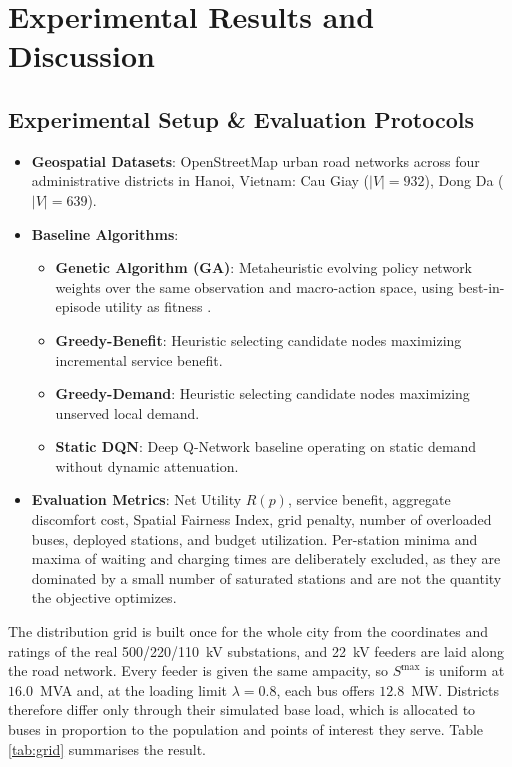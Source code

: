 \documentclass[10pt, conference, a4paper, compsocconf]{IEEEtran}
\begin{document}
\section{Experimental Results and Discussion}
\label{sec:results}

\subsection{Experimental Setup \& Evaluation Protocols}
\begin{itemize}
    \item \textbf{Geospatial Datasets}: OpenStreetMap urban road networks across four administrative districts in Hanoi, Vietnam: Cau Giay ($|V|=932$), Dong Da ($|V|=639$).
    \item \textbf{Baseline Algorithms}:
    \begin{itemize}
        \item \textbf{Genetic Algorithm (GA)}: Metaheuristic evolving policy network weights over the same observation and macro-action space, using best-in-episode utility as fitness \cite{chen2023}.
        \item \textbf{Greedy-Benefit}: Heuristic selecting candidate nodes maximizing incremental service benefit.
        \item \textbf{Greedy-Demand}: Heuristic selecting candidate nodes maximizing unserved local demand.
        \item \textbf{Static DQN}: Deep Q-Network baseline operating on static demand without dynamic attenuation.
    \end{itemize}
    \item \textbf{Evaluation Metrics}: Net Utility $R(p)$, service benefit, aggregate discomfort cost, Spatial Fairness Index, grid penalty, number of overloaded buses, deployed stations, and budget utilization. Per-station minima and maxima of waiting and charging times are deliberately excluded, as they are dominated by a small number of saturated stations and are not the quantity the objective optimizes.
\end{itemize}

The distribution grid is built once for the whole city from the coordinates and
ratings of the real 500/220/110~kV substations, and 22~kV feeders are laid along
the road network. Every feeder is given the same ampacity, so $S^{\max}$ is
uniform at $16.0$~MVA and, at the loading limit $\lambda=0.8$, each bus offers
$12.8$~MW. Districts therefore differ only through their simulated base load,
which is allocated to buses in proportion to the population and points of
interest they serve. Table \ref{tab:grid} summarises the result.
\end{document}
